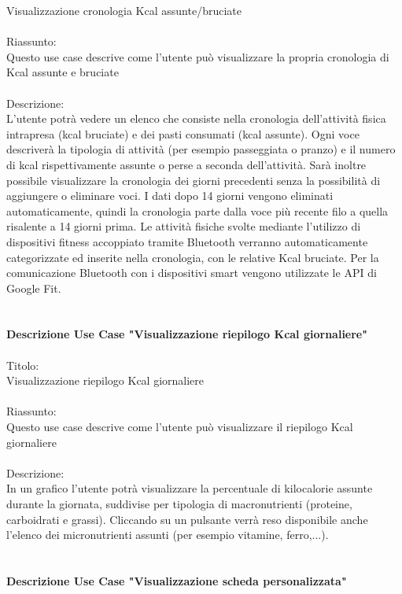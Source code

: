 \documentclass{article}
\begin{document}
Visualizzazione cronologia Kcal assunte/bruciate\\
\\
Riassunto:\\
Questo use case descrive come l’utente può visualizzare la propria cronologia di Kcal assunte e bruciate\\
\\
Descrizione:\\
L’utente potrà vedere un elenco che consiste nella cronologia dell’attività fisica intrapresa (kcal bruciate) e dei pasti consumati (kcal assunte).
Ogni voce descriverà la tipologia di attività (per esempio passeggiata o pranzo) e il numero di kcal rispettivamente assunte o perse a seconda
dell’attività. Sarà inoltre possibile visualizzare la cronologia dei giorni precedenti senza la possibilità di aggiungere o eliminare voci. I dati
dopo 14 giorni vengono eliminati automaticamente, quindi la cronologia parte dalla voce più recente filo a quella risalente a 14 giorni prima. Le
attività fisiche svolte mediante l’utilizzo di dispositivi fitness accoppiato tramite Bluetooth verranno automaticamente categorizzate ed inserite
nella cronologia, con le relative Kcal bruciate. Per la comunicazione Bluetooth con i dispositivi smart vengono utilizzate le API di Google Fit.\\
\\
\\
\textbf{Descrizione Use Case "Visualizzazione riepilogo Kcal giornaliere"}\\
\\
Titolo:\\
Visualizzazione riepilogo Kcal giornaliere\\
\\
Riassunto:\\
Questo use case descrive come l’utente può visualizzare il riepilogo Kcal giornaliere\\
\\
Descrizione:\\
In un grafico l’utente potrà visualizzare la percentuale di kilocalorie assunte durante la giornata, suddivise per tipologia di macronutrienti
(proteine, carboidrati e grassi). Cliccando su un pulsante verrà reso disponibile anche l’elenco dei micronutrienti assunti (per esempio vitamine,
ferro,...).\\
\\
\\
\textbf{Descrizione Use Case "Visualizzazione scheda personalizzata"}\\
\\
\end{document}
